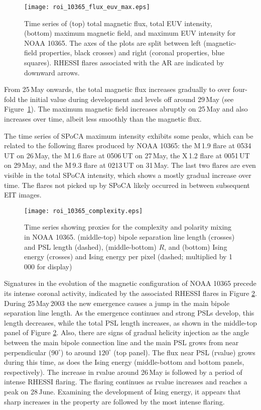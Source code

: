 {\begin{figure}[!t]
\centerline{\texttt{[image: roi\_10365\_flux\_euv\_max.eps]}}
\caption[NOAA 10365 photosphere and coronal evolution.]{Time series of (top) total magnetic flux, total EUV intensity, (bottom)
maximum magnetic field, and maximum EUV intensity for NOAA 10365. The axes of
the plots are split between left (magnetic-field properties, black crosses) and
right (coronal properties, blue squares). RHESSI flares associated with the AR
are indicated by downward arrows.}
\label{10365evolve_flux_bmax}
\end{figure}

From 25\,May onwards, the total magnetic flux increases gradually to over
four-fold the initial value during development and levels off around 29\,May (see
Figure~\ref{10365evolve_flux_bmax}). 
The maximum magnetic field increases
abruptly on 25\,May and also increases over time, albeit less smoothly
than the magnetic flux.

The time series of \gls{SPoCA} maximum intensity exhibits some peaks, which can be related to the following flares produced by NOAA 10365: the M\,1.9 flare at 0534\,UT on 26\,May, the
M\,1.6 flare at 0506\,UT on 27\,May, the X\,1.2 flare at 0051\,UT
on 29\,May, and the M\,9.3 flare at 0213\,UT on 31\,May.
The last two flares are even visible in the total \gls{SPoCA} intensity, which shows
a mostly gradual increase over time. The flares not picked up by \gls{SPoCA} likely occurred
in between subsequent \gls{EIT} images. 

\begin{figure}[!t]
\centerline{\texttt{[image: roi\_10365\_complexity.eps]}}
\caption[NOAA 10365 complexity evolution.]{Time series showing proxies for the complexity and polarity mixing in NOAA 10365. (middle-top) bipole separation line length (crosses) and PSL
length (dashed), (middle-bottom)  $R$, and (bottom) Ising energy (crosses) and
Ising energy per pixel (dashed; multiplied by 1\,000 for display)}
\label{10365evolve_complexity}
\end{figure}

Signatures in the evolution of the magnetic configuration of NOAA 10365 precede its
intense coronal activity, indicated by the associated \gls{RHESSI} flares in Figure
\ref{10365evolve_complexity}. During 25\,May\,2003 the new emergence causes a jump in the main bipole separation line length.
As the emergence continues and strong \glspl{PSL} develop, this length decreases,
while the total \gls{PSL} length increases, as shown in the middle-top panel of Figure
\ref{10365evolve_complexity}. Also, there are signs of gradual helicity
injection
as the angle between the main bipole connection line and the main \gls{PSL} grows from
near perpendicular ($90^{\circ}$) to around $120^{\circ}$ (top panel). The flux
near \gls{PSL} (\gls{rvalue})
grows during this time, as does the Ising energy (middle-bottom and bottom
panels, respectively). The increase in \gls{rvalue} around 26\,May is followed by a period of
intense \gls{RHESSI} flaring. The flaring continues as \gls{rvalue} increases and reaches a peak on 28\,June. Examining the development of Ising energy, it appears that sharp increases in the property
are followed by the most
intense flaring.

}
